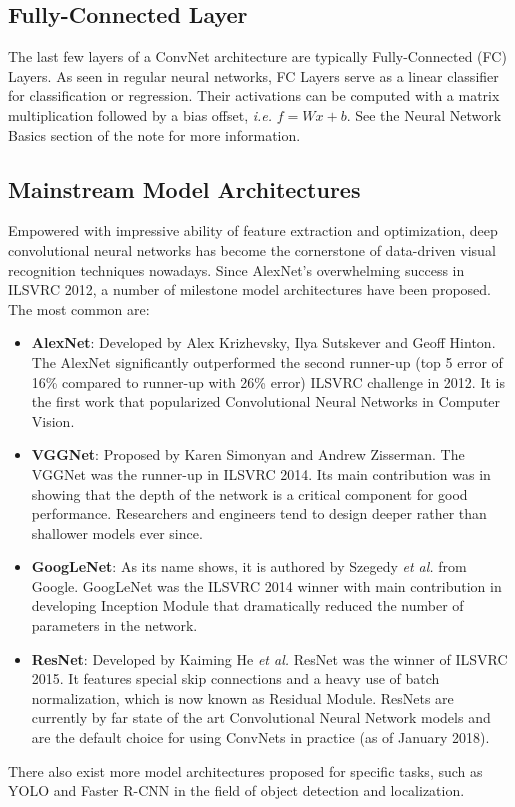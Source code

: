 \documentclass[twoside]{article}
\begin{document}
\subsection{Fully-Connected Layer}
The last few layers of a ConvNet architecture are typically Fully-Connected (FC) Layers. As seen in regular neural networks, FC Layers serve as a linear classifier for classification or regression. Their activations can be computed with a matrix multiplication followed by a bias offset, \textit{i.e.} $f = Wx + b$. See the Neural Network Basics section of the note for more information.

\subsection{Mainstream Model Architectures}
Empowered with impressive ability of feature extraction and optimization, deep convolutional neural networks has become the cornerstone of data-driven visual recognition techniques nowadays. Since AlexNet's overwhelming success in ILSVRC 2012, a number of milestone model architectures have been proposed. The most common are:
\begin{itemize}
\item \textbf{AlexNet}\cite{alexnet}: Developed by Alex Krizhevsky, Ilya Sutskever and Geoff Hinton. The AlexNet significantly outperformed the second runner-up (top 5 error of 16\% compared to runner-up with 26\% error) ILSVRC challenge in 2012. It is the first work that popularized Convolutional Neural Networks in Computer Vision.
\item \textbf{VGGNet}\cite{vggnet}: Proposed by Karen Simonyan and Andrew Zisserman. The VGGNet was the runner-up in ILSVRC 2014. Its main contribution was in showing that the depth of the network is a critical component for good performance. Researchers and engineers tend to design deeper rather than shallower models ever since.
\item \textbf{GoogLeNet}\cite{googlenet}: As its name shows, it is authored by Szegedy \textit{et al.} from Google. GoogLeNet was the ILSVRC 2014 winner with main contribution in developing Inception Module that dramatically reduced the number of parameters in the network.
\item \textbf{ResNet}\cite{resnet}:  Developed by Kaiming He \textit{et al.} ResNet was the winner of ILSVRC 2015. It features special skip connections and a heavy use of batch normalization, which is now known as Residual Module. ResNets are currently by far state of the art Convolutional Neural Network models and are the default choice for using ConvNets in practice (as of January 2018).
\end{itemize}

There also exist more model architectures proposed for specific tasks, such as YOLO\cite{yolo} and Faster R-CNN\cite{faster_rcnn} in the field of object detection and localization.



\end{document}
